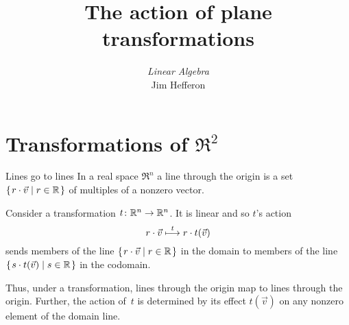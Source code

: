 \documentclass[10pt,t]{beamer}
\title[Plane transformations] %
{The action of plane transformations}
\author{\textit{Linear Algebra} \\ {\small Jim Hef{}feron}}
\institute{
  \texttt{http://joshua.smcvt.edu/linearalgebra}
}
\date{}
\begin{document}
\begin{frame}
  \titlepage
\end{frame}




\section{Transformations of $\Re^2$}
\begin{frame}{Lines go to lines}
In a real space $\Re^n$ a line through the origin is a set 
$\mbox{$\{\hspace{0.1em}r\cdot \vec{v}\mid r\in\mathbb{R}\hspace{0.1em}\}$}$ of multiples of a 
nonzero vector. 

Consider a transformation
$\mbox{$t\colon \mathbb{R}^n\to \mathbb{R}^n$}$.
It is linear and so $t$'s action 
\begin{equation*}
  r\cdot\vec{v}\stackrel{t}{\longmapsto} r\cdot t(\vec{v})
\end{equation*}
sends members of the line $\mbox{$\{\hspace{0.1em}r\cdot \vec{v}\mid r\in\mathbb{R}\hspace{0.1em}\}$}$
in the domain to members of the line
$\mbox{$\{\hspace{0.1em}s\cdot t(\vec{v})\mid s\in\mathbb{R}\hspace{0.1em}\}$}$
in the codomain. 

Thus, under a transformation, lines through the origin 
map to lines through the origin.
Further, the action of~$t$ is determined by its effect $t(\vec{v})$
on any nonzero element of the domain line.
\end{frame}
\end{document}
